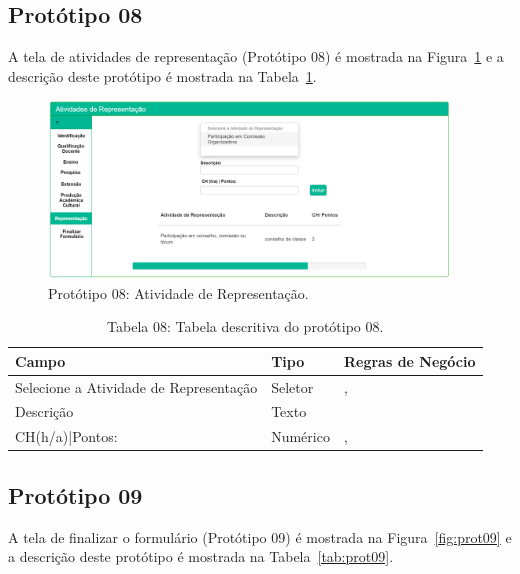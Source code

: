 \newpage
\subsection{Protótipo 08}\label{prototipo08}

A tela de atividades de representação (Protótipo 08) é mostrada na Figura~\ref{fig:prot08} e a descrição deste protótipo é mostrada na Tabela~\ref{tab:prot08}.

\begin{figure}[H]
    \centering
    \includegraphics[width=0.95\textwidth]{img/8pagina_representacao.png}
    \caption[Protótipo 08: Atividade de Representação]{Protótipo 08: Atividade de Representação.}
    \label{fig:prot08}
\end{figure}


\begin{table}[H]
\centering
\caption[Tabela 08: Tabela descritiva do protótipo 08.]{Tabela 08: Tabela descritiva do protótipo 08.}
\label{tab:prot08}
\begin{tabular}{@{}lll@{}}
\toprule
Campo                                   & Tipo     &  Regras de Negócio     \\ \midrule
Selecione a Atividade de Representação  & Seletor  &    \nameref{rn011}, \nameref{rn019}\\
Descrição                               & Texto    &    \nameref{rn011}                 \\
CH(h/a)|Pontos:                         & Numérico &    \nameref{rn011}, \nameref{rn020}\\ \bottomrule
\end{tabular}
\end{table}

\newpage
\subsection{Protótipo 09}\label{prototipo09}
A tela de finalizar o formulário (Protótipo 09) é mostrada na Figura~\ref{fig:prot09} e a descrição deste protótipo é mostrada na Tabela~\ref{tab:prot09}.


